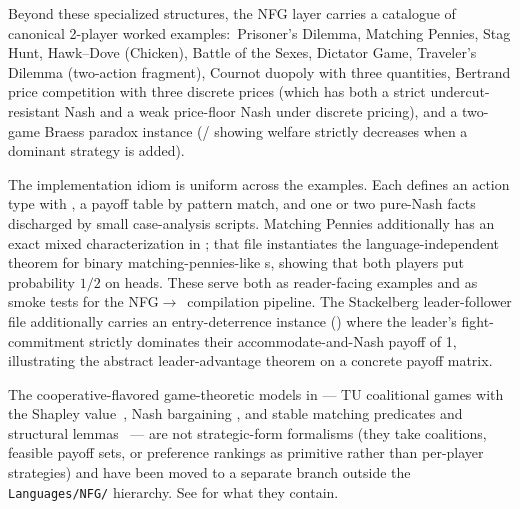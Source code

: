 Beyond these specialized structures, the NFG layer carries a
catalogue of canonical 2-player worked examples:\ Prisoner's
Dilemma, Matching Pennies, Stag Hunt, Hawk–Dove (Chicken), Battle
of the Sexes, Dictator Game, Traveler's Dilemma (two-action
fragment), Cournot duopoly with three quantities,
Bertrand price competition with three discrete prices (which has
both a strict undercut-resistant Nash and a weak price-floor Nash
under discrete pricing), and a two-game Braess paradox instance
(/ showing welfare
strictly decreases when a dominant strategy is added).

The implementation idiom is uniform across the examples.  Each
defines an action type with , a
payoff table by pattern match, and one or two pure-Nash facts
discharged by small case-analysis scripts.  Matching Pennies
additionally has an exact mixed
characterization in ;
that file instantiates the language-independent
 theorem for binary
matching-pennies-like \KG{}s, showing that both players put probability
$1/2$ on heads.  These serve both as reader-facing examples and as
smoke tests for the NFG$\to$\KG\ compilation pipeline.  The
Stackelberg leader-follower file additionally carries an
entry-deterrence instance () where the
leader's fight-commitment strictly dominates their
accommodate-and-Nash payoff of 1, illustrating the abstract
leader-advantage theorem on a concrete payoff matrix.

The cooperative-flavored game-theoretic models in
 — TU coalitional games with the Shapley
value~\citep{Shapley1953}, Nash bargaining
\citep{Nash1950bargaining}, and stable matching predicates and
structural lemmas~\citep{GaleShapley1962} — are not strategic-form
formalisms (they take coalitions, feasible payoff sets, or
preference rankings as primitive rather than per-player
strategies) and have been moved to a separate
 branch outside the \texttt{Languages/NFG/}
hierarchy.  See  for what they
contain.


